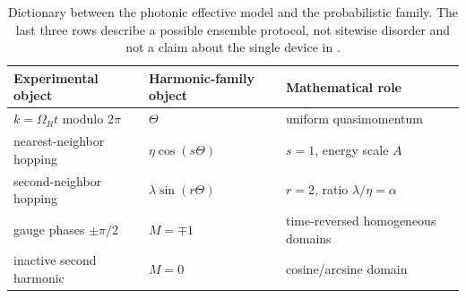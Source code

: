 \documentclass[11pt]{amsart}
\numberwithin{equation}{section}\setcounter{tocdepth}{3}\setcounter{secnumdepth}{3}
\begin{document}
\begin{table}[htbp]
\centering
\begin{tabular}{lll}\toprule
Experimental object & Harmonic-family object & Mathematical role\\ \midrule
$k=\Omega_Rt$ modulo $2\pi$ & $\Theta$ & uniform quasimomentum\\
nearest-neighbor hopping & $\eta\cos(s\Theta)$ & $s=1$, energy scale $A$\\
second-neighbor hopping & $\lambda\sin(r\Theta)$ & $r=2$, ratio $\lambda/\eta=\alpha$\\
gauge phases $\pm\pi/2$ & $M=\mp1$ & time-reversed homogeneous domains\\
inactive second harmonic & $M=0$ & cosine/arcsine domain\\
\bottomrule
\end{tabular}
\caption{Dictionary between the photonic effective model and the probabilistic
family.  The last three rows describe a possible ensemble protocol, not sitewise
disorder and not a claim about the single device in \cite{DuttEtAl2019}.}
\label{tab:dutt_dictionary}
\end{table}
\end{document}
